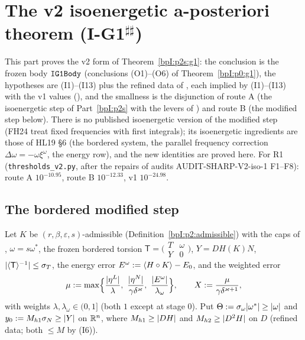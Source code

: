 \sloppy
\section{The v2 isoenergetic a-posteriori theorem (I-G1$^{\sharp\sharp}$)}\label{bpI:p2s2}

This part proves the v2 form of Theorem~\ref{bpI:p2s:g1}: the conclusion is the frozen body $\texttt{IG1Body}$ (conclusions (O1)--(O6) of
Theorem~\ref{bpI:p0:g1}), the hypotheses are (I1)--(I13) plus the refined data of , each implied by (I1)--(I13) with the
v1 values (), and the smallness is the disjunction of route A (the isoenergetic step of Part~\ref{bpI:p2s} with the
levers of ) and route B (the modified step below). There is no published isoenergetic version of the modified step
(FH24 treat fixed frequencies with first integrals); its isoenergetic ingredients are those of HL19 \S6 (the bordered system, the parallel frequency
correction $\Delta\omega=-\omega\xi^\omega$, the energy row), and the new identities are proved here. For R1
(\texttt{thresholds\_v2.py}, after the repairs of audits AUDIT-SHARP-V2-iso-1 F1--F8): route A $10^{-10.95}$, route B $10^{-12.33}$, v1 $10^{-24.98}$.

\subsection{The bordered modified step}\label{bpI:p2s2:sec-step}

Let $K$ be $(r,\beta,\varepsilon,s)$-admissible (Definition~\ref{bpI:p2:admissible}) with the caps of , $\omega=s\omega^*$, the frozen
bordered torsion $\mathsf T=\bigl(\begin{smallmatrix}T&\omega\\Y&0\end{smallmatrix}\bigr)$, $Y=DH(K)N$, $\lvert \langle \mathsf T\rangle^{-1}\rvert\le\sigma_T$, the energy error
$E^\omega:=\langle H\circ K\rangle-E_0$, and the weighted error
\[
\mu:=\max\Bigl\{\frac{\abs{\eta^L}}{\lambda},\ \frac{\abs{\eta^N}}{\gamma\delta^\varkappa},\ \frac{\abs{E^\omega}}{\lambda_\omega}\Bigr\},\qquad X:=\frac\mu{\gamma\delta^{\varkappa+1}},
\]
with weights $\lambda,\lambda_\omega\in(0,1]$ (both $1$ except at stage $0$). Put $\Theta:=\sigma_\omega\lvert \omega^*\rvert\ge\lvert \omega\rvert$ and $y_0:=M_{h1}\sigma_N\ge\lvert Y\rvert$ on $\mathbb{R}^n$, where
$M_{h1}\ge\lvert DH\rvert$ and $M_{h2}\ge\lvert D^2H\rvert$ on $D$ (refined data; both $\le M$ by (I6)).

